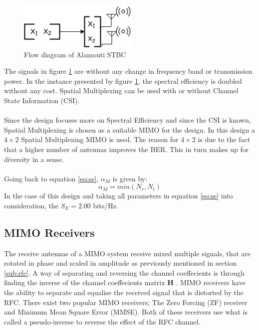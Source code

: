 \documentclass[11pt]{report}
\renewcommand{\vec}[1]{\mathbf{#1}} %
\begin{document}
\begin{figure}[h!]
	\centering
	\includegraphics[scale=0.65]{resources/sm.png}
	\caption{Flow diagram of Alamouti STBC}
	\label{fig:sm}
\end{figure} 

The signals in figure \ref{fig:sm} are without any change in frequency band or transmission power. In the instance presented by figure \ref{fig:sm}, the spectral efficiency is doubled without any cost. Spatial Multiplexing can be used with or without Channel State Information (CSI).
\\
\\
Since the design focuses more on Spectral Efficiency and  since the CSI is known, Spatial Multiplexing is chosen as a suitable MIMO for the design. In this design a $4\times2$ Spatial Multiplexing MIMO is used. The reason for $4\times2$ is due to the fact that a higher number of antennas improves the BER. This in turn makes up for diversity in a sense.
\\
\\
Going back to equation \ref{eq:se}, $\alpha_M$ is given by:
\begin{equation}
\label{fig:nrnt}
\alpha_M = min(N_r,N_t)
\end{equation}
In the case of this design and taking all parameters in equation \ref{eq:se} into consideration, the $S_E = 2.00$ bits/Hz.

\subsection{MIMO Receivers}
\label{sub:rec}
The receive antennas of a MIMO system receive mixed multiple signals, that are rotated in phase and scaled in amplitude as previously mentioned in section \ref{sub:rfc}. A way of separating and reversing the channel coeffecients is through finding the inverse of the channel coeffecients matrix $\vec{H}$ \cite{37}. MIMO receivers have the ability to separate and equalise the received signal that is distorted by the RFC. There exist two popular MIMO receivers; The Zero Forcing (ZF) receiver and Minimum Mean Square Error (MMSE). Both of these receivers use what is called a pseudo-inverse to reverse the effect of the RFC channel.  
\end{document}
